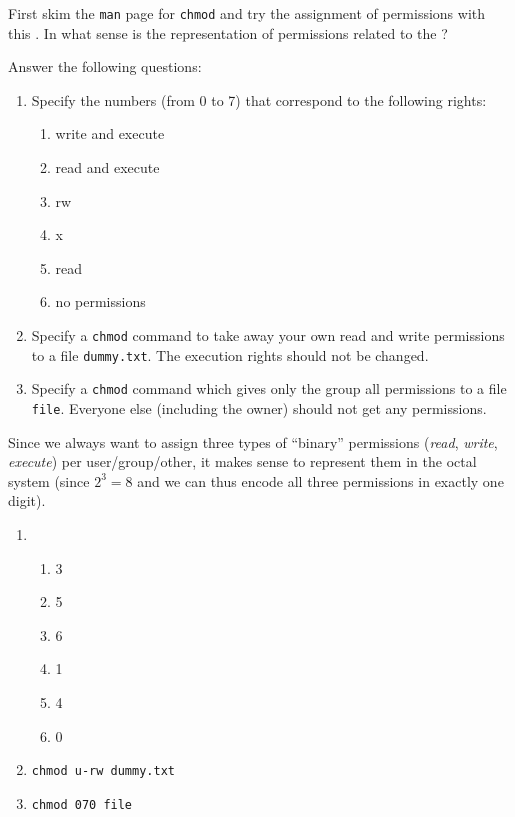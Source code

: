\documentclass[english]{sheet}
\begin{document}
\begin{exercise}[subtitle=\texttt{chmod}]
    First skim the \texttt{man} page for \texttt{chmod} and try the assignment of permissions with this . In what sense is the representation of permissions related to the ?

    Answer the following questions:
    \begin{enumerate}
        \item Specify the numbers (from 0 to 7) that correspond to the following rights:
        \begin{enumerate}
            \item write and execute
            \item read and execute
            \item rw
            \item x
            \item read
            \item no permissions
        \end{enumerate}
        \item Specify a \texttt{chmod} command to take away your own read and write permissions to a file \texttt{dummy.txt}. The execution rights should not be changed.
        \item Specify a \texttt{chmod} command which gives only the group all permissions to a file \texttt{file}. Everyone else (including the owner) should not get any permissions.
    \end{enumerate}
\end{exercise}

\begin{solution}
    Since we always want to assign three types of ``binary'' permissions (\emph{read}, \emph{write}, \emph{execute}) per user/group/other, it makes sense to represent them in the octal system (since \(2^3 = 8\) and we can thus encode all three permissions in exactly one digit).

    \begin{enumerate}
        \item
        \begin{enumerate}
            \item 3
            \item 5
            \item 6
            \item 1
            \item 4
            \item 0
        \end{enumerate}
        \item \texttt{chmod u-rw dummy.txt}
        \item \texttt{chmod 070 file}
    \end{enumerate}
\end{solution}
\end{document}
